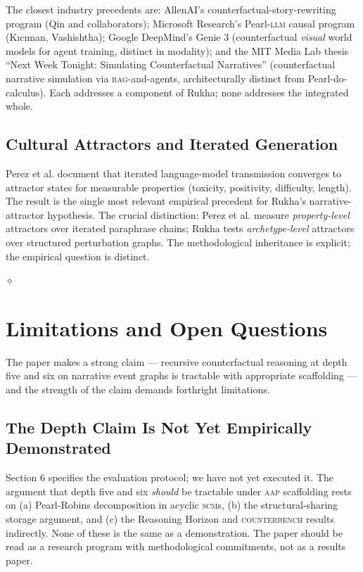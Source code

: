 \documentclass[11pt]{article}
\theoremstyle{rukha}
\newcommand{\diamondrule}{%
  \begin{center}\vspace{0.6em}%
  {\scriptsize $\diamond$}\vspace{0.6em}\end{center}}
\begin{document}
The closest industry precedents are: AllenAI's
counterfactual-story-rewriting program (Qin and collaborators);
Microsoft Research's Pearl-\textsc{llm} causal program (Kıcıman,
Vashishtha); Google DeepMind's Genie 3 \cite{genie3} (counterfactual
\emph{visual} world models for agent training, distinct in modality);
and the MIT Media Lab thesis ``Next Week Tonight: Simulating
Counterfactual Narratives'' \cite{nextweektonight} (counterfactual
narrative simulation via \textsc{rag}-and-agents, architecturally
distinct from Pearl-do-calculus). Each addresses a component of Rukha;
none addresses the integrated whole.

\subsection{Cultural Attractors and Iterated Generation}

Perez et al. \cite{perezattractors} document that iterated language-model
transmission converges to attractor states for measurable
properties (toxicity, positivity, difficulty, length). The result is the
single most relevant empirical precedent for Rukha's
narrative-attractor hypothesis. The crucial distinction:
Perez et al. measure \emph{property-level} attractors over iterated
paraphrase chains; Rukha tests \emph{archetype-level} attractors over
structured perturbation graphs. The methodological inheritance is
explicit; the empirical question is distinct.

\diamondrule

\section{Limitations and Open Questions}

The paper makes a strong claim --- recursive counterfactual reasoning
at depth five and six on narrative event graphs is tractable with
appropriate scaffolding --- and the strength of the claim demands
forthright limitations.

\subsection{The Depth Claim Is Not Yet Empirically Demonstrated}

Section 6 specifies the evaluation protocol; we have not yet executed
it. The argument that depth five and six \emph{should} be tractable
under \textsc{aap} scaffolding rests on (a) Pearl-Robins decomposition
in acyclic \textsc{scm}s, (b) the structural-sharing storage argument,
and (c) the Reasoning Horizon and \textsc{counterbench} results
indirectly. None of these is the same as a demonstration. The paper
should be read as a research program with methodological commitments,
not as a results paper.
\end{document}
